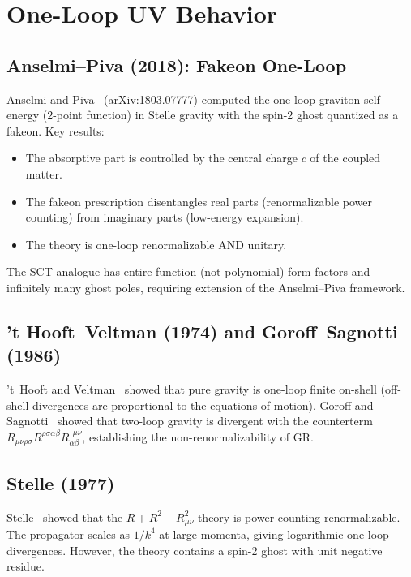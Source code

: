 \documentclass[11pt,a4paper]{article}
\theoremstyle{remark}
\begin{document}
\section{One-Loop UV Behavior}

\subsection{Anselmi--Piva (2018): Fakeon One-Loop}

Anselmi and Piva~\cite{AnselmiPiva2018a} (arXiv:1803.07777)
computed the one-loop graviton self-energy (2-point function) in
Stelle gravity with the spin-2 ghost quantized as a fakeon. Key
results:
\begin{itemize}
  \item The absorptive part is controlled by the central charge $c$
        of the coupled matter.
  \item The fakeon prescription disentangles real parts (renormalizable
        power counting) from imaginary parts (low-energy expansion).
  \item The theory is one-loop renormalizable AND unitary.
\end{itemize}

The SCT analogue has entire-function (not polynomial) form factors
and infinitely many ghost poles, requiring extension of the Anselmi--Piva
framework.

\subsection{'t Hooft--Veltman (1974) and Goroff--Sagnotti (1986)}

't~Hooft and Veltman~\cite{tHooftVeltman1974} showed that pure gravity
is one-loop finite on-shell (off-shell divergences are proportional to the
equations of motion). Goroff and Sagnotti~\cite{GoroffSagnotti1986}
showed that two-loop gravity is divergent with the counterterm
$R_{\mu\nu\rho\sigma} R^{\rho\sigma\alpha\beta} R_{\alpha\beta}^{\ \ \mu\nu}$,
establishing the non-renormalizability of GR.

\subsection{Stelle (1977)}

Stelle~\cite{Stelle1977} showed that the $R + R^2 + R_{\mu\nu}^2$
theory is power-counting renormalizable. The propagator scales as $1/k^4$
at large momenta, giving logarithmic one-loop divergences. However, the
theory contains a spin-2 ghost with unit negative residue.
\end{document}
